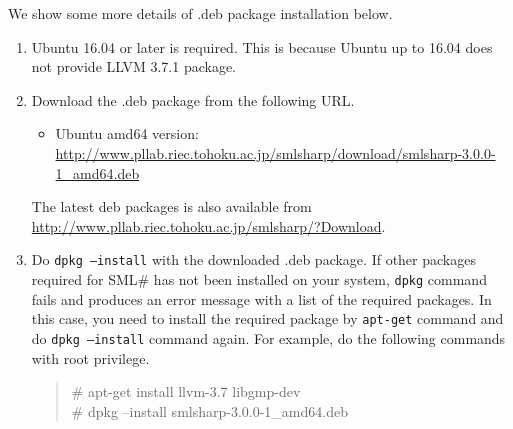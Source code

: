 \documentclass{jbook}
\newcommand{\smlsharp}{SML\#}
\newcommand{\version}{3.0.0}
\newcommand\eurl[1]{{\edef\eurlTMP{{#1}}\expandafter\url\eurlTMP}}
\newenvironment{program}{\begin{quote}\begin{tt}}%
                        {\end{tt}\end{quote}}
\begin{document}
	We show some more details of \mbox{.deb} package installation
below.

\begin{enumerate}
\item Ubuntu 16.04 or later is required.
	This is because Ubuntu up to 16.04 does not provide LLVM 3.7.1
package.
\item Download the \mbox{.deb} package from the following URL.
\begin{itemize}
\item Ubuntu amd64 version:
\eurl{http://www.pllab.riec.tohoku.ac.jp/smlsharp/download/smlsharp-\version-1\_amd64.deb}
\end{itemize}
	The latest deb packages is also available from
\url{http://www.pllab.riec.tohoku.ac.jp/smlsharp/?Download}.
\item 
	Do {\tt dpkg --install} with the downloaded \mbox{.deb} package.
	If other packages required for \smlsharp{} has not been installed
on your system, {\tt dpkg} command fails and produces an error message with
a list of the required packages.
	In this case, you need to install the required package by {\tt apt-get}
command and do {\tt dpkg --install} command again.
	For example, %
do the following commands with root privilege.
\begin{program}
\# apt-get install llvm-3.7 libgmp-dev\\
\# dpkg --install smlsharp-\version{}-1\_amd64.deb
\end{program}
\end{enumerate}
\end{document}
